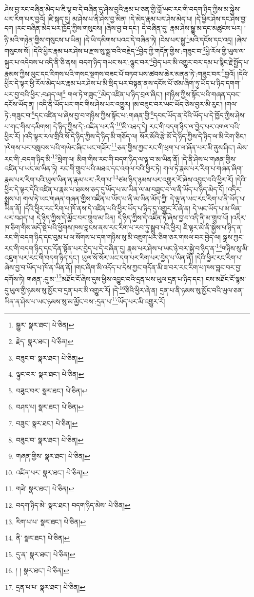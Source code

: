 ཤེས་བྱ་རང་བཞིན་མེད་པ་ཇི་ལྟ་བ་དེ་བཞིན་དུ་ཤེས་བྱའི་རྣམ་པ་ཅན་གྱི་བློ་ཡང་རང་གི་བདག་ཉིད་ཀྱིས་མ་སྐྱེས་པར་རིག་པར་བྱའོ། །ཇི་སྐད་དུ། མ་ཤེས་པ་ནི་ཤེས་བྱ་མིན། །དེ་མེད་རྣམ་པར་ཤེས་མེད་པ། །དེ་ཕྱིར་ཤེས་དང་ཤེས་བྱ་དག །རང་བཞིན་མེད་པར་ཁྱོད་ཀྱིས་གསུངས། །ཞེས་བྱ་བ་དང་། དེ་བཞིན་དུ། རྣམ་ཤེས་སྒྱུ་མ་དང་མཚུངས་པར། །ཉི་མའི་གཉེན་གྱིས་གསུངས་པ་ཡིན། །དེ་ཡི་དམིགས་པའང་དེ་བཞིན་ཏེ། །ངེས་པར་སྒྱུ་\footnote{སྒྱུར་  སྣར་ཐང་།  པེ་ཅིན། }མའི་དངོས་དང་འདྲ། །ཞེས་གསུངས་སོ། །དེའི་ཕྱིར་རྣམ་པར་ཤེས་པ་རྫས་སུ་སྨྲ་བའི་བརྗེད་\footnote{རྗེད་  སྣར་ཐང་།  པེ་ཅིན། }བྱེད་ཀྱི་གདོན་གྱིས་:གཟུང་བ་\footnote{བཟུང་བ་  སྣར་ཐང་།  པེ་ཅིན། }ཕྱི་རོལ་གྱི་ཡུལ་ལ་སྐུར་པ་འདེབས་པ་འདི་ནི་ཅི་ནས། བདག་ཉིད་གཡང་སར་:ལྷུང་བར་\footnote{ལྟུང་བར་  སྣར་ཐང་།  པེ་ཅིན། }བྱེད་པར་མི་འགྱུར་བར་དམ་པ་སྙིང་རྗེ་སྤྱོད་པ་རྣམས་ཀྱིས་ལུང་དང་རིགས་པའི་གསང་སྔགས་བཟང་པོ་བཏབ་པས་ཚབས་ཆེར་མནན་ཏེ་:གཟུང་བར་\footnote{བཟུང་བར་  སྣར་ཐང་།  པེ་ཅིན། }བྱའོ། །དེའི་ཕྱིར་དེ་ལྟར་ཕྱི་རོལ་མེད་པར་རྣམ་པར་ཤེས་པ་མི་སྲིད་པར་བསྟན་ནས་དངོས་པོ་ཙམ་ཞིག་ཏུ་ཡོད་པ་ཉིད་དགག་པར་བྱ་བའི་ཕྱིར་:བཤད་ལ།\footnote{བཤད་པ།  སྣར་ཐང་།  པེ་ཅིན། } གལ་ཏེ་གཟུང་\footnote{བཟུང་  སྣར་ཐང་།  པེ་ཅིན། }མེད་འཛིན་པ་ཉིད་བྲལ་ཞིང་། །གཉིས་ཀྱིས་སྟོང་པའི་གཞན་དབང་དངོས་ཡོད་ན། །འདི་ནི་ཡོད་པར་གང་གིས་ཤེས་པར་འགྱུར། །མ་བཟུང་བར་ཡང་ཡོད་ཅེས་བྱར་མི་རུང་། །གལ་ཏེ་:གཟུང་བ་\footnote{བཟུང་བ་  སྣར་ཐང་།  པེ་ཅིན། }དང་འཛིན་པ་ཞེས་བྱ་བ་གཉིས་ཀྱིས་སྟོང་པ་:གཞན་གྱི་\footnote{གཞན་གྱིས་  སྣར་ཐང་།  པེ་ཅིན། }དབང་ཡོད་ན་དེའི་ཡོད་པ་དེ་ཁྱོད་ཀྱིས་ཤེས་པ་གང་གིས་དམིགས། དེ་ཉིད་ཀྱིས་དེ་:འཛིན་པར་ནི་\footnote{འཛིན་པར་  སྣར་ཐང་།  པེ་ཅིན། }མི་འཐད་དེ། རང་གི་བདག་ཉིད་ལ་བྱེད་པར་འགལ་བའི་ཕྱིར་རོ། །འདི་ལྟར་རལ་གྲིའི་སོ་དེ་ཉིད་ཀྱིས་དེ་ཉིད་མི་གཅོད་ལ། སོར་མོའི་རྩེ་མོ་དེ་ཉིད་ཀྱིས་དེ་ཉིད་ལ་མི་རེག་ཅིང་། །ལེགས་པར་བསླབས་པའི་གཡེར་ཞིང་ཡང་གཟོར་\footnote{གཟེ་  སྣར་ཐང་།  པེ་ཅིན། }ཅན་གྱིས་ཀྱང་རང་གི་ཕྲག་པ་ལ་ཞོན་པར་མི་ནུས་ཤིང་། མེས་རང་གི་:བདག་ཉིད་མི་\footnote{བདག་ཉིད་མེ་  སྣར་ཐང་། བདག་ཉིད་མེས་  པེ་ཅིན། }སྲེག་ལ། མིག་གིས་རང་གི་བདག་ཉིད་ལ་ལྟ་བ་མ་ཡིན་ནོ། །དེ་ནི་ཤེས་པ་གཞན་གྱིས་འཛིན་པ་ཡང་མ་ཡིན་ཏེ། རང་གི་གྲུབ་པའི་མཐའ་དང་འགལ་བའི་ཕྱིར་ཏེ། གལ་ཏེ་རྣམ་པར་རིག་པ་གཞན་ཞིག་རྣམ་པར་རིག་པའི་ཡུལ་ཡིན་ན་རྣམ་པར་:རིག་པ་\footnote{རིག་པ་པ་  སྣར་ཐང་།  པེ་ཅིན། }ཙམ་ཉིད་ཉམས་པར་འགྱུར་རོ་ཞེས་འབྱུང་བའི་ཕྱིར་རོ། །དེའི་ཕྱིར་དེ་ལྟར་དེའི་འཛིན་པ་རྣམ་པ་ཐམས་ཅད་དུ་ཡོད་པ་མ་ཡིན་ལ་མ་བཟུང་བ་ལ་ནི་ཡོད་པ་ཉིད་མེད་དོ། །འདིར་སྨྲས་པ། གལ་ཏེ་ཡང་གཞན་གཞན་གྱིས་འཛིན་པ་ཡོད་པ་ནི་མ་ཡིན་མོད་ཀྱི། དེ་ལྟ་ན་ཡང་རང་རིག་པ་ནི་ཡོད་པ་ཡིན་ནོ། །དེའི་ཕྱིར་རང་རིག་པ་ཁོ་ནས་དེ་འཛིན་པའི་ཕྱིར་ཡོད་པ་ཉིད་དུ་འགྱུར་རོ་ཞེ་ན། དེ་ཡང་ཡོད་པ་མ་ཡིན་པར་བཤད་པ། དེ་ཉིད་ཀྱིས་དེ་མྱོང་བར་གྲུབ་མ་ཡིན། དེ་ཉིད་ཀྱིས་དེ་འཛིན་ཏོ་ཞེས་བྱ་བ་འདི་ནི་མ་གྲུབ་པོ། །འདིར་ཁ་ཅིག་གིས་མདོ་སྡེ་པའི་ཕྱོགས་ཁས་བླངས་ནས་རང་རིག་པ་རབ་ཏུ་སྒྲུབ་པའི་ཕྱིར། ཇི་ལྟར་མེ་ནི་སྐྱེས་པ་ཉིད་ན་རང་གི་བདག་ཉིད་དང་བུམ་པ་ལ་སོགས་པ་དག་གཉིས་སུ་མི་འཇུག་པར་ཅིག་ཅར་གསལ་བར་བྱེད་ལ། སྒྲས་ཀྱང་རང་གི་བདག་ཉིད་དང་དོན་སྟོན་པར་བྱེད་པ་དེ་བཞིན་དུ། རྣམ་པར་ཤེས་པ་ཡང་ཉེ་བར་སྐྱེ་བ་ཉིད་ན་\footnote{ནི་  སྣར་ཐང་།  པེ་ཅིན། }གཉིས་སུ་མི་འཇུག་པར་རང་གི་བདག་ཉིད་དང་། ཡུལ་སོ་སོར་ཡང་དག་པར་རིག་པར་བྱེད་པ་ཡིན་ནོ། །དེའི་ཕྱིར་རང་རིག་པ་ཞེས་བྱ་བ་ཡོད་པ་ཁོ་ན་ཡིན་ནོ། །གང་ཞིག་མི་འདོད་པ་དེས་ཀྱང་གདོན་མི་ཟ་བར་རང་རིག་པ་ཁས་བླང་བར་བྱ་དགོས་ཏེ། གཞན་:དུ་མ་\footnote{དུ་ན་  སྣར་ཐང་།  པེ་ཅིན། }མཐོང་ངོ་ཞེས་དུས་ཕྱིས་འབྱུང་བའི་དྲན་པས་ཡུལ་དྲན་པ་ཉིད་དང་། ངས་མཐོང་ངོ་སྙམ་དུ་ཡུལ་གྱི་ཉམས་སུ་མྱོང་བ་དྲན་པར་མི་འགྱུར་རོ། །དེ་\footnote{། །  སྣར་ཐང་།  པེ་ཅིན། }ཅིའི་ཕྱིར་ཞེ་ན། དྲན་པ་ནི་ཉམས་སུ་མྱོང་བའི་ཡུལ་ཅན་ཡིན་ན་ཤེས་པ་ཡང་ཉམས་སུ་མ་མྱོང་བས་:དྲན་པ་\footnote{དྲན་པ་པ་  སྣར་ཐང་།  པེ་ཅིན། }ཡོད་པར་མི་འགྱུར་རོ། 